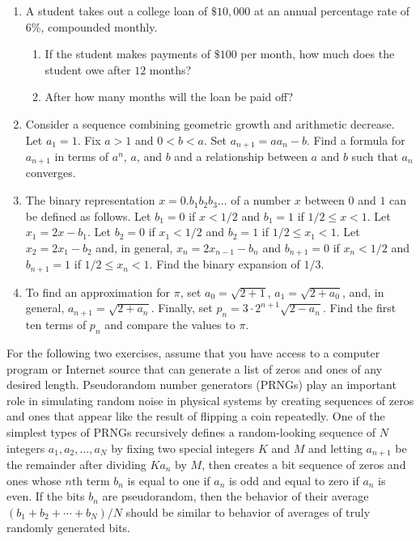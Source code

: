 \documentclass{exercises}
\begin{document}
\begin{enumerate}[resume]
\begin{enumerate}[label=(\alph*)]
\end{enumerate}
\item \techrequired A student takes out a college loan of $\$10{,}000$ at an annual percentage rate of $6\%$, compounded monthly.
\begin{enumerate}[label=(\alph*)]
  \item If the student makes payments of $\$100$ per month, how much does the student owe after $12$ months?
  \item After how many months will the loan be paid off?
\end{enumerate}
\item \techrequired Consider a sequence combining geometric growth and arithmetic decrease. Let $a_{1}=1$. Fix $a>1$ and $0<b<a$. Set $a_{n+1}=a a_{n}-b$. Find a formula for $a_{n+1}$ in terms of $a^{n}$, $a$, and $b$ and a relationship between $a$ and $b$ such that $a_{n}$ converges.
\item \techrequired The binary representation $x=0.b_{1}b_{2}b_{3}\ldots$ of a number $x$ between $0$ and $1$ can be defined as follows. Let $b_{1}=0$ if $x<1/2$ and $b_{1}=1$ if $1/2\le x<1$. Let $x_{1}=2x-b_{1}$. Let $b_{2}=0$ if $x_{1}<1/2$ and $b_{2}=1$ if $1/2\le x_{1}<1$. Let $x_{2}=2x_{1}-b_{2}$ and, in general, $x_{n}=2x_{n-1}-b_{n}$ and $b_{n+1}=0$ if $x_{n}<1/2$ and $b_{n+1}=1$ if $1/2\le x_{n}<1$. Find the binary expansion of $1/3$.
\item \techrequired To find an approximation for $\pi$, set $a_{0}=\sqrt{2+1}$, $a_{1}=\sqrt{2+a_{0}}$, and, in general, $a_{n+1}=\sqrt{2+a_{n}}$. Finally, set $p_{n}=3\cdot 2^{n+1}\sqrt{2-a_{n}}$. Find the first ten terms of $p_{n}$ and compare the values to $\pi$.
\end{enumerate}

For the following two exercises, assume that you have access to a computer program or Internet source that can generate a list of zeros and ones of any desired length. Pseudorandom number generators (PRNGs) play an important role in simulating random noise in physical systems by creating sequences of zeros and ones that appear like the result of flipping a coin repeatedly. One of the simplest types of PRNGs recursively defines a random-looking sequence of $N$ integers $a_{1},a_{2},\ldots,a_{N}$ by fixing two special integers $K$ and $M$ and letting $a_{n+1}$ be the remainder after dividing $K a_{n}$ by $M$, then creates a bit sequence of zeros and ones whose $n\text{th}$ term $b_{n}$ is equal to one if $a_{n}$ is odd and equal to zero if $a_{n}$ is even. If the bits $b_{n}$ are pseudorandom, then the behavior of their average $(b_{1}+b_{2}+\cdots+b_{N})/N$ should be similar to behavior of averages of truly randomly generated bits.
\end{document}
